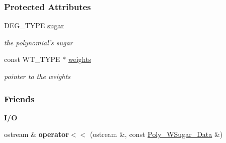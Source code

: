 \subsubsection*{Protected Attributes}
\begin{DoxyCompactItemize}
\item 
\mbox{\label{group__strategygroup_a8a3f679ee5536587a4794a8c20b92cb9}} 
D\+E\+G\+\_\+\+T\+Y\+PE \hyperlink{group__strategygroup_a8a3f679ee5536587a4794a8c20b92cb9}{sugar}
\begin{DoxyCompactList}\small\item\em the polynomial's sugar \end{DoxyCompactList}\item 
\mbox{\label{group__strategygroup_acbe98e7f937ab0c074a732becdd8c619}} 
const W\+T\+\_\+\+T\+Y\+PE $\ast$ \hyperlink{group__strategygroup_acbe98e7f937ab0c074a732becdd8c619}{weights}
\begin{DoxyCompactList}\small\item\em pointer to the weights \end{DoxyCompactList}\end{DoxyCompactItemize}
\subsubsection*{Friends}
\begin{Indent}\textbf{ I/O}\par
\begin{DoxyCompactItemize}
\item 
\mbox{\label{group__strategygroup_aaa672dbee5334fe3b57404502489f800}} 
ostream \& {\bfseries operator$<$$<$} (ostream \&, const \hyperlink{group__strategygroup_class_poly___w_sugar___data}{Poly\+\_\+\+W\+Sugar\+\_\+\+Data} \&)
\end{DoxyCompactItemize}
\end{Indent}


